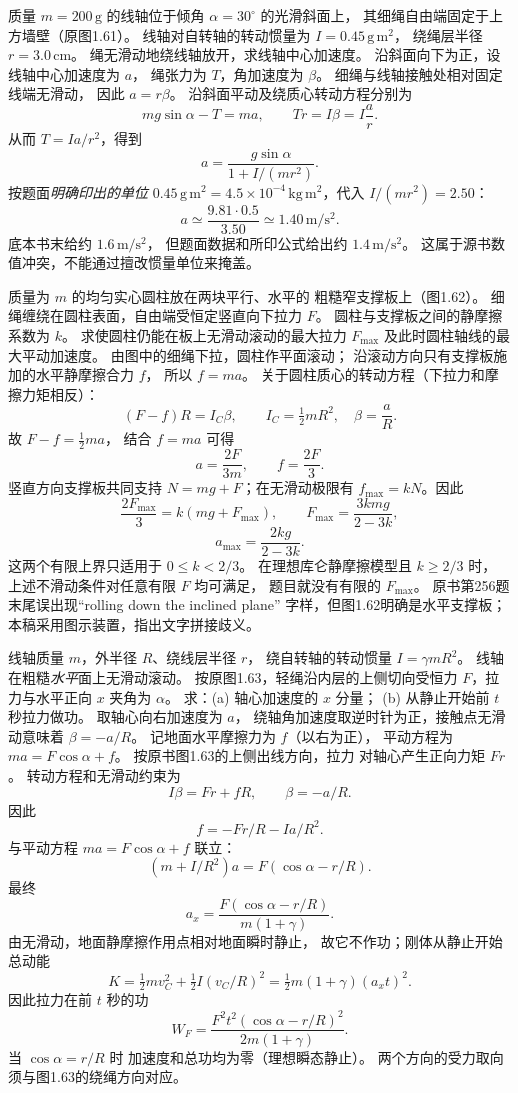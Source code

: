 质量 $m=200\,\mathrm g$ 的线轴位于倾角
$\alpha=30^\circ$ 的光滑斜面上，
其细绳自由端固定于上方墙壁（原图1.61）。
线轴对自转轴的转动惯量为
$I=0.45\,\mathrm{g\,m^2}$，
绕绳层半径 $r=3.0\,\mathrm{cm}$。
绳无滑动地绕线轴放开，求线轴中心加速度。
\exsolution
沿斜面向下为正，设线轴中心加速度为 $a$，
绳张力为 $T$，角加速度为 $\beta$。
细绳与线轴接触处相对固定线端无滑动，
因此 $a=r\beta$。
沿斜面平动及绕质心转动方程分别为
\[
mg\sin\alpha-T=ma,\qquad
Tr=I\beta=I\frac ar.
\]
从而 $T=Ia/r^2$，得到
\[
\boxed{a=\frac{g\sin\alpha}{1+I/(mr^2)}}.
\]
按题面\emph{明确印出的单位}
$0.45\,\mathrm{g\,m^2}=4.5\times10^{-4}
\,\mathrm{kg\,m^2}$，代入
$I/(mr^2)=2.50$：
\[
\boxed{a\simeq\frac{9.81\cdot0.5}{3.50}
\simeq1.40\,\mathrm{m/s^2}}.
\]
\excheck 底本书末给约 $1.6\,\mathrm{m/s^2}$，
但题面数据和所印公式给出约 $1.4\,\mathrm{m/s^2}$。
这属于源书数值冲突，不能通过擅改惯量单位来掩盖。

质量为 $m$ 的均匀实心圆柱放在两块平行、水平的
粗糙窄支撑板上（图1.62）。
细绳缠绕在圆柱表面，自由端受恒定竖直向下拉力 $F$。
圆柱与支撑板之间的静摩擦系数为 $k$。
求使圆柱仍能在板上无滑动滚动的最大拉力
$F_{\max}$ 及此时圆柱轴线的最大平动加速度。
\exsolution
由图中的细绳下拉，圆柱作平面滚动；
沿滚动方向只有支撑板施加的水平静摩擦合力 $f$，
所以 $f=ma$。
关于圆柱质心的转动方程（下拉力和摩擦力矩相反）：
\[
(F-f)R=I_C\beta,\qquad
I_C=\tfrac12mR^2,\quad \beta=\frac aR.
\]
故 $F-f=\frac12ma$，
结合 $f=ma$ 可得
\[
\boxed{a=\frac{2F}{3m}},\qquad
f=\frac{2F}{3}.
\]
竖直方向支撑板共同支持
$N=mg+F$；在无滑动极限有
$f_{\max}=kN$。因此
\[
\frac{2F_{\max}}{3}=k(mg+F_{\max}),
\qquad
\boxed{F_{\max}=\frac{3kmg}{2-3k}},
\]
\[
\boxed{a_{\max}=\frac{2kg}{2-3k}}.
\]
\excheck 这两个有限上界只适用于 $0\le k<2/3$。
在理想库仑静摩擦模型且 $k\ge2/3$ 时，
上述不滑动条件对任意有限 $F$ 均可满足，
题目就没有有限的 $F_{\max}$。
原书第256题末尾误出现“rolling down the inclined plane”
字样，但图1.62明确是水平支撑板；
本稿采用图示装置，指出文字拼接歧义。

线轴质量 $m$，外半径 $R$、绕线层半径 $r$，
绕自转轴的转动惯量
$I=\gamma mR^2$。
线轴在粗糙\emph{水平}面上无滑动滚动。
按原图1.63，轻绳沿内层的上侧切向受恒力
$F$，拉力与水平正向 $x$ 夹角为 $\alpha$。
求：(a) 轴心加速度的 $x$ 分量；
(b) 从静止开始前 $t$ 秒拉力做功。
\exsolution
取轴心向右加速度为 $a$，
绕轴角加速度取逆时针为正，接触点无滑动意味着
$\beta=-a/R$。
记地面水平摩擦力为 $f$（以右为正），
平动方程为
$m a=F\cos\alpha+f$。
按原书图1.63的上侧出线方向，拉力
对轴心产生正向力矩 $Fr$。
转动方程和无滑动约束为
\[
I\beta=Fr+fR,\qquad \beta=-a/R.
\]
因此
\[
f=-Fr/R-Ia/R^2.
\]
与平动方程 $ma=F\cos\alpha+f$ 联立：
\[
(m+I/R^2)a=F(\cos\alpha-r/R).
\]
最终
\[
\boxed{a_x=\frac{F(\cos\alpha-r/R)}{m(1+\gamma)}}.
\]
由无滑动，地面静摩擦作用点相对地面瞬时静止，
故它不作功；刚体从静止开始总动能
\[
K=\tfrac12mv_C^2+\tfrac12I(v_C/R)^2
=\tfrac12m(1+\gamma)(a_xt)^2.
\]
因此拉力在前 $t$ 秒的功
\[
\boxed{W_F=\frac{F^2t^2(\cos\alpha-r/R)^2}
{2m(1+\gamma)}}.
\]
\excheck 当 $\cos\alpha=r/R$ 时
加速度和总功均为零（理想瞬态静止）。
两个方向的受力取向须与图1.63的绕绳方向对应。

